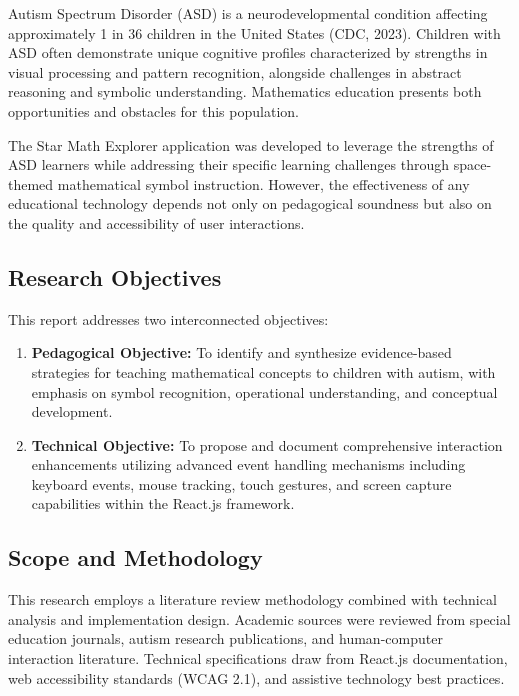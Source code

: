 \documentclass[12pt, a4paper]{article}
\begin{document}
Autism Spectrum Disorder (ASD) is a neurodevelopmental condition affecting approximately 1 in 36 children in the United States (CDC, 2023). Children with ASD often demonstrate unique cognitive profiles characterized by strengths in visual processing and pattern recognition, alongside challenges in abstract reasoning and symbolic understanding. Mathematics education presents both opportunities and obstacles for this population.

The Star Math Explorer application was developed to leverage the strengths of ASD learners while addressing their specific learning challenges through space-themed mathematical symbol instruction. However, the effectiveness of any educational technology depends not only on pedagogical soundness but also on the quality and accessibility of user interactions.

\subsection{Research Objectives}

This report addresses two interconnected objectives:

\begin{enumerate}[leftmargin=*]
    \item \textbf{Pedagogical Objective:} To identify and synthesize evidence-based strategies for teaching mathematical concepts to children with autism, with emphasis on symbol recognition, operational understanding, and conceptual development.
    
    \item \textbf{Technical Objective:} To propose and document comprehensive interaction enhancements utilizing advanced event handling mechanisms including keyboard events, mouse tracking, touch gestures, and screen capture capabilities within the React.js framework.
\end{enumerate}

\subsection{Scope and Methodology}

This research employs a literature review methodology combined with technical analysis and implementation design. Academic sources were reviewed from special education journals, autism research publications, and human-computer interaction literature. Technical specifications draw from React.js documentation, web accessibility standards (WCAG 2.1), and assistive technology best practices.
\end{document}
